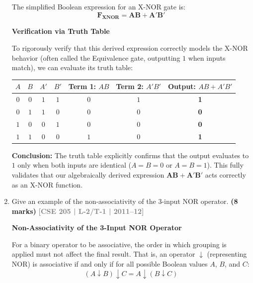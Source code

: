 \documentclass[12pt,a3paper]{article}
\newcommand{\yr}[1]{\hfill\textcolor{gray}{\small\textbf{[#1]}}}
\newcommand{\mk}[1]{\textcolor{orange!70!black}{\small\textbf{(#1 marks)}}}
\begin{document}
\begin{enumerate}
\begin{tcolorbox}[enhanced,breakable,ansbox,colback=cA!4,colframe=cA,boxrule=0.8pt,arc=5pt,title={\textbf{Answer}},fonttitle=\bfseries\color{white},colbacktitle=cA]
The simplified Boolean expression for an X-NOR gate is:
\[ \mathbf{F_{\text{XNOR}} = AB + A'B'} \]

\vspace{0.4cm}
\textbf{Verification via Truth Table}

To rigorously verify that this derived expression correctly models the X-NOR behavior (often called the Equivalence gate, outputting $1$ when inputs match), we can evaluate its truth table:

\begin{center}
\renewcommand{\arraystretch}{1.3}
\begin{tabular}{|c|c||c|c||c|c||c|}
\hline
\textbf{$A$} & \textbf{$B$} & \textbf{$A'$} & \textbf{$B'$} & \textbf{Term 1:} $AB$ & \textbf{Term 2:} $A'B'$ & \textbf{Output:} $AB + A'B'$ \\
\hline
$0$ & $0$ & $1$ & $1$ & $0$ & $1$ & \textbf{1} \\
\hline
$0$ & $1$ & $1$ & $0$ & $0$ & $0$ & \textbf{0} \\
\hline
$1$ & $0$ & $0$ & $1$ & $0$ & $0$ & \textbf{0} \\
\hline
$1$ & $1$ & $0$ & $0$ & $1$ & $0$ & \textbf{1} \\
\hline
\end{tabular}
\end{center}

\vspace{0.2cm}
\textbf{Conclusion:}
The truth table explicitly confirms that the output evaluates to $1$ only when both inputs are identical ($A=B=0$ or $A=B=1$). This fully validates that our algebraically derived expression $\mathbf{AB + A'B'}$ acts correctly as an X-NOR function.

\end{tcolorbox}

\item Give an example of the non-associativity of the 3-input NOR operator.
\mk{8} \yr{CSE 205 | L-2/T-1 | 2011--12}

\begin{tcolorbox}[enhanced,breakable,ansbox,colback=cA!4,colframe=cA,boxrule=0.8pt,arc=5pt,title={\textbf{Answer}},fonttitle=\bfseries\color{white},colbacktitle=cA]

\textbf{Non-Associativity of the 3-Input NOR Operator}

For a binary operator to be associative, the order in which grouping is applied must not affect the final result. That is, an operator $\downarrow$ (representing NOR) is associative if and only if for all possible Boolean values $A$, $B$, and $C$:
\[ (A \downarrow B) \downarrow C = A \downarrow (B \downarrow C) \]


\end{tcolorbox}
\end{enumerate}
\end{document}
